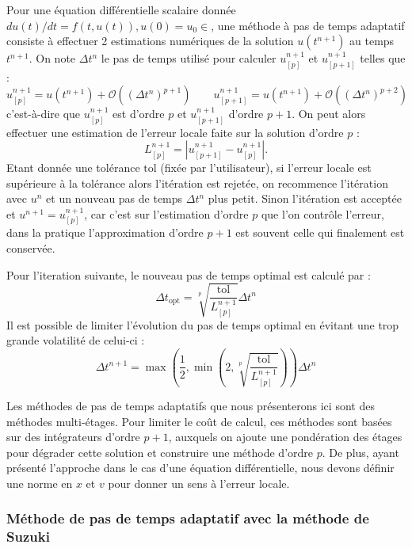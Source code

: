 Pour une équation différentielle scalaire donnée $du(t)/dt = f(t, u(t)), u(0)=u_0\in$, une méthode à pas de temps adaptatif consiste à effectuer 2 estimations numériques de la solution $u(t^{n+1})$ au temps $t^{n+1}$. On note $\Delta t^n$ le pas de temps utilisé pour calculer $u^{n+1}_{[p]}$ et $u^{n+1}_{[p+1]}$ telles que :
$$
  u^{n+1}_{[p]} = u(t^{n+1}) + \mathcal{O}((\Delta t^n)^{p+1}) \qquad u^{n+1}_{[p+1]} = u(t^{n+1}) + \mathcal{O}((\Delta t^n)^{p+2})
$$
c'est-à-dire que $u^{n+1}_{[p]}$ est d'ordre $p$ et $u^{n+1}_{[p+1]}$ d'ordre $p+1$. On peut alors effectuer une estimation de l'erreur locale faite sur la solution d'ordre $p$ :
\begin{equation}
  L_{[p]}^{n+1} =  |u^{n+1}_{[p+1]} - u^{n+1}_{[p]}|. 
  \label{eq:Lerror}
\end{equation}
Etant donnée une tolérance $\text{tol}$ (fixée par l'utilisateur), si l'erreur locale est supérieure à la tolérance alors l'itération est rejetée, on recommence l'itération avec $u^n$ et un nouveau pas de temps $\Delta t^n$ plus petit. Sinon l'itération est acceptée et $u^{n+1} = u^{n+1}_{[p]}$, car c'est sur l'estimation d'ordre $p$ que l'on contrôle l'erreur, dans la pratique l'approximation d'ordre $p+1$ est souvent celle qui finalement est conservée.

Pour l'iteration suivante, le nouveau pas de temps optimal est calculé par :
\begin{equation}
  \Delta t_\text{opt} = \sqrt[p]{\frac{\text{tol}}{L_{[p]}^{n+1}}}\Delta t^n
  \label{eq:dtopt}
\end{equation}
Il est possible de limiter l'évolution du pas de temps optimal en évitant une trop grande volatilité de celui-ci :
$$
  \Delta t^{n+1} = \max\left(\frac{1}{2},\min\left(2,\sqrt[p]{\frac{\text{tol}}{L_{[p]}^{n+1}}}\right)\right)\Delta t^n
$$

Les méthodes de pas de temps adaptatifs que nous présenterons ici sont des méthodes multi-étages. Pour limiter le coût de calcul, ces méthodes sont basées sur des intégrateurs d'ordre $p+1$, auxquels on ajoute une pondération des étages pour dégrader cette solution et construire une méthode d'ordre $p$. De plus, ayant présenté l'approche dans le cas d'une équation différentielle, nous devons définir une norme en $x$ et $v$ pour donner un sens à l'erreur locale.  


\subsubsection{Méthode de pas de temps adaptatif avec la méthode de Suzuki}

